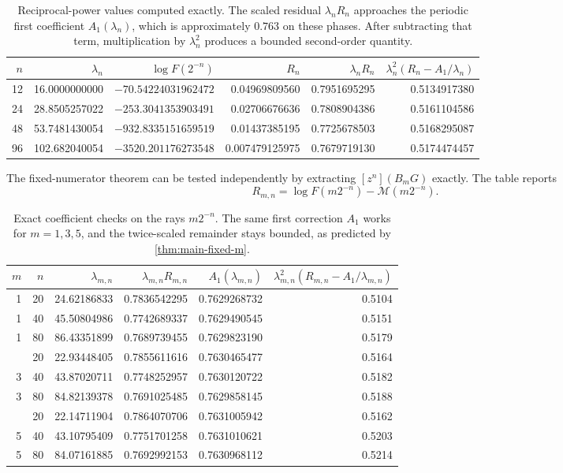 \documentclass[11pt,oneside]{article}
\theoremstyle{definition}
\theoremstyle{remark}
\newcommand{\Mmain}{\mathcal M}
\begin{document}
\begin{table}[htbp]
\centering
\small
\begin{tabular}{@{}rrrrrr@{}}
\toprule
$n$ & $\lambda_n$ & $\log F(2^{-n})$ & $R_n$ & $\lambda_nR_n$ &
$\lambda_n^2(R_n-A_1/\lambda_n)$\\
\midrule
12 & 16.0000000000 & $-70.54224031962472$ & 0.04969809560 & 0.7951695295 & 0.5134917380\\
24 & 28.8505257022 & $-253.3041353903491$ & 0.02706676636 & 0.7808904386 & 0.5161104586\\
48 & 53.7481430054 & $-932.8335151659519$ & 0.01437385195 & 0.7725678503 & 0.5168295087\\
96 & 102.682040054 & $-3520.201176273548$ & 0.007479125975 & 0.7679719130 & 0.5174474457\\
\bottomrule
\end{tabular}
\caption{Reciprocal-power values computed exactly.  The scaled residual
$\lambda_nR_n$ approaches the periodic first coefficient $A_1(\lambda_n)$, which is approximately $0.763$ on these phases.  After subtracting that term, multiplication by $\lambda_n^2$ produces a bounded second-order quantity.}
\label{tab:inverse-numerics}
\end{table}

The fixed-numerator theorem can be tested independently by extracting
$[z^n](B_mG)$ exactly.  The table reports
\begin{equation}
 R_{m,n}=\log F(m2^{-n})-\Mmain(m2^{-n}).
\end{equation}

\begin{table}[htbp]
\centering
\small
\begin{tabular}{@{}rrrrrr@{}}
\toprule
$m$ & $n$ & $\lambda_{m,n}$ & $\lambda_{m,n}R_{m,n}$ &
$A_1(\lambda_{m,n})$ &
$\lambda_{m,n}^2(R_{m,n}-A_1/\lambda_{m,n})$\\
\midrule
1 & 20 & 24.62186833 & 0.7836542295 & 0.7629268732 & 0.5104\\
1 & 40 & 45.50804986 & 0.7742689337 & 0.7629490545 & 0.5151\\
1 & 80 & 86.43351899 & 0.7689739455 & 0.7629823190 & 0.5179\\
\addlinespace
3 & 20 & 22.93448405 & 0.7855611616 & 0.7630465477 & 0.5164\\
3 & 40 & 43.87020711 & 0.7748252957 & 0.7630120722 & 0.5182\\
3 & 80 & 84.82139378 & 0.7691025485 & 0.7629858145 & 0.5188\\
\addlinespace
5 & 20 & 22.14711904 & 0.7864070706 & 0.7631005942 & 0.5162\\
5 & 40 & 43.10795409 & 0.7751701258 & 0.7631010621 & 0.5203\\
5 & 80 & 84.07161885 & 0.7692992153 & 0.7630968112 & 0.5214\\
\bottomrule
\end{tabular}
\caption{Exact coefficient checks on the rays $m2^{-n}$.  The same first correction
$A_1$ works for $m=1,3,5$, and the twice-scaled remainder stays bounded, as predicted by
\cref{thm:main-fixed-m}.}
\label{tab:fixed-m-numerics}
\end{table}
\end{document}
